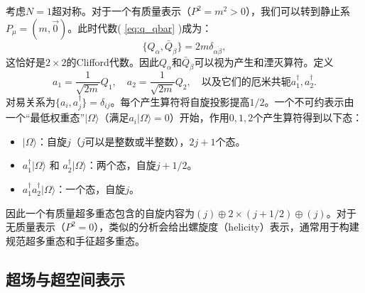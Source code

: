 考虑$N=1$超对称。对于一个有质量表示（$P^2 = m^2 > 0$），我们可以转到静止系$P_\mu = (m, \vec 0)$。此时代数( \ref{eq:q_qbar} )成为：
\begin{equation}
\{ Q_\alpha, \bar Q_{\dot\beta} \} = 2 m \delta_{\alpha\dot\beta},
\end{equation}
这恰好是$2\times 2$的Clifford代数。因此$Q_\alpha$和$\bar Q_{\dot\beta}$可以视为产生和湮灭算符。定义
\begin{equation}
a_1 = \frac{1}{\sqrt{2m}} Q_1, \quad a_2 = \frac{1}{\sqrt{2m}} Q_2, \quad \text{以及它们的厄米共轭} a_1^\dagger, a_2^\dagger.
\end{equation}
对易关系为$\{a_i, a_j^\dagger\} = \delta_{ij}$。每个产生算符将自旋投影提高$1/2$。一个不可约表示由一个“最低权重态”$|\Omega\rangle$（满足$a_i|\Omega\rangle=0$）开始，作用$0,1,2$个产生算符得到以下态：
\begin{itemize}
\item $|\Omega\rangle$：自旋$j$（$j$可以是整数或半整数），$2j+1$个态。
\item $a_1^\dagger|\Omega\rangle$ 和 $a_2^\dagger|\Omega\rangle$：两个态，自旋$j+1/2$。
\item $a_1^\dagger a_2^\dagger|\Omega\rangle$：一个态，自旋$j$。
\end{itemize}
因此一个有质量超多重态包含的自旋内容为$(j) \oplus 2\times (j+1/2) \oplus (j)$。对于无质量表示（$P^2=0$），类似的分析会给出螺旋度（helicity）表示，通常用于构建规范超多重态和手征超多重态。

\subsection*{超场与超空间表示}

